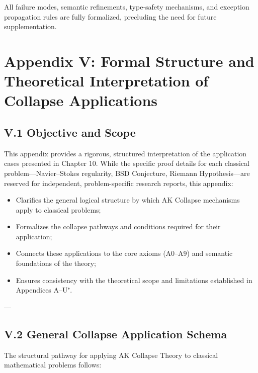 \documentclass[11pt]{article}
\begin{document}
All failure modes, semantic refinements, type-safety mechanisms, and exception propagation rules are fully formalized, precluding the need for future supplementation.




\section*{Appendix V: Formal Structure and Theoretical Interpretation of Collapse Applications}

\subsection*{V.1 Objective and Scope}

This appendix provides a rigorous, structured interpretation of the application cases presented in Chapter 10.  
While the specific proof details for each classical problem—Navier–Stokes regularity, BSD Conjecture, Riemann Hypothesis—are reserved for independent, problem-specific research reports, this appendix:

\begin{itemize}
    \item Clarifies the general logical structure by which AK Collapse mechanisms apply to classical problems;
    \item Formalizes the collapse pathways and conditions required for their application;
    \item Connects these applications to the core axioms (A0–A9) and semantic foundations of the theory;
    \item Ensures consistency with the theoretical scope and limitations established in Appendices A–U⁺.
\end{itemize}

---

\subsection*{V.2 General Collapse Application Schema}

The structural pathway for applying AK Collapse Theory to classical mathematical problems follows:
\end{document}
